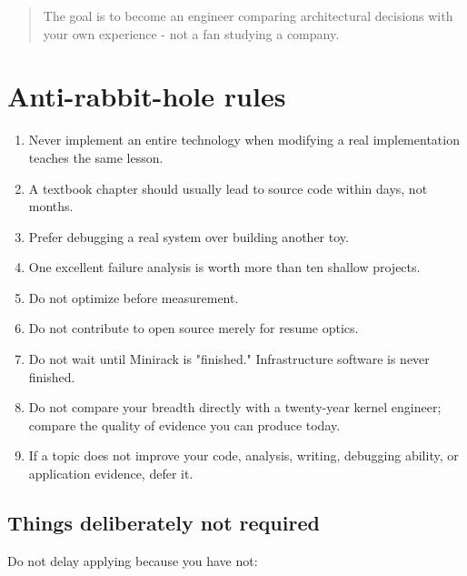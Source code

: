 \documentclass[11pt,letterpaper]{article}
\begin{document}
\begin{quote}
The goal is to become an engineer comparing architectural decisions with your own experience - not a fan studying a company.
\end{quote}

\section{Anti-rabbit-hole rules}\label{sec:24}

\begin{enumerate}

\item Never implement an entire technology when modifying a real implementation teaches the same lesson.

\item A textbook chapter should usually lead to source code within days, not months.

\item Prefer debugging a real system over building another toy.

\item One excellent failure analysis is worth more than ten shallow projects.

\item Do not optimize before measurement.

\item Do not contribute to open source merely for resume optics.

\item Do not wait until Minirack is "finished." Infrastructure software is never finished.

\item Do not compare your breadth directly with a twenty-year kernel engineer; compare the quality of evidence you can produce today.

\item If a topic does not improve your code, analysis, writing, debugging ability, or application evidence, defer it.

\end{enumerate}

\subsection*{Things deliberately not required}

Do not delay applying because you have not:
\end{document}
